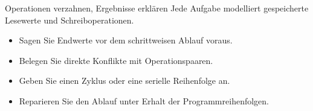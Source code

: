 \begin{frame}[t]{Operationen verzahnen, Ergebnisse erklären}
Jede Aufgabe modelliert gespeicherte Lesewerte und Schreiboperationen.
\medskip
\begin{itemize}
\item Sagen Sie Endwerte vor dem schrittweisen Ablauf voraus.
\item Belegen Sie direkte Konflikte mit Operationspaaren.
\item Geben Sie einen Zyklus oder eine serielle Reihenfolge an.
\item Reparieren Sie den Ablauf unter Erhalt der Programmreihenfolgen.
\end{itemize}
\end{frame}
